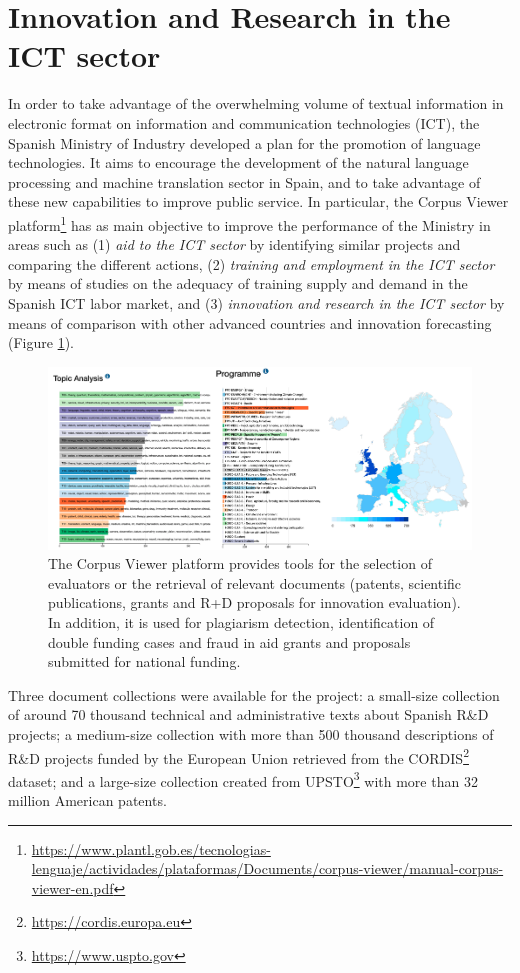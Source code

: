 \section{Innovation and Research in the ICT sector}
\label{sec:corpus-viewer}

In order to take advantage of the overwhelming volume of textual information in electronic format on information and communication technologies (ICT), the Spanish Ministry of Industry developed a plan for the promotion of language technologies. It aims to encourage the development of the natural language processing and machine translation sector in Spain, and to take advantage of these new capabilities to improve public service. In particular, the Corpus Viewer platform\footnote{\url{https://www.plantl.gob.es/tecnologias-lenguaje/actividades/plataformas/Documents/corpus-viewer/manual-corpus-viewer-en.pdf}} has as main objective to improve the performance of the Ministry in areas such as (1) \textit{aid to the ICT sector} by identifying similar projects and comparing the different actions, (2) \textit{training and employment in the ICT sector} by means of studies on the adequacy of training supply and demand in the Spanish ICT labor market, and (3) \textit{innovation and research in the ICT sector} by means of comparison with other advanced countries and innovation forecasting (Figure \ref{fig:corpus-viewer}).


\begin{figure}[ht]
    \centering
    \includegraphics[width=0.8\linewidth]{corpus-viewer.png}
    \caption{The Corpus Viewer platform provides tools for the selection of evaluators or the retrieval of relevant documents (patents, scientific publications, grants and R+D proposals for innovation evaluation). In addition, it is used for plagiarism detection, identification of double funding cases and fraud in aid grants and proposals submitted for national funding.}
    \label{fig:corpus-viewer}
\end{figure}

Three document collections were available for the project: a small-size collection of around 70 thousand technical and administrative texts about Spanish R\&D projects; a medium-size collection with more than 500 thousand descriptions of R\&D projects funded by the European Union retrieved from the CORDIS\footnote{\url{https://cordis.europa.eu}} dataset; and a large-size collection created from UPSTO\footnote{\url{https://www.uspto.gov}} with more than 32 million American patents.

